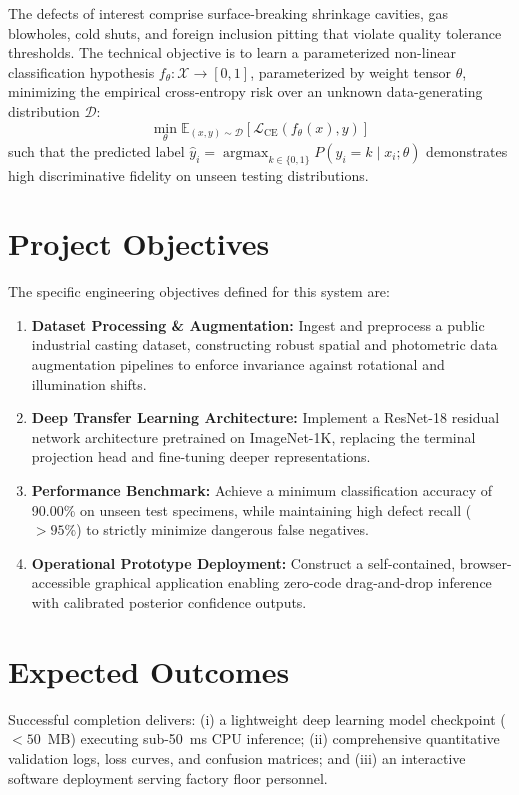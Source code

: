 \documentclass[12pt,a4paper]{report}
\begin{document}
The defects of interest comprise surface-breaking shrinkage cavities, gas blowholes, cold shuts, and foreign inclusion pitting that violate quality tolerance thresholds. The technical objective is to learn a parameterized non-linear classification hypothesis $f_\theta: \mathcal{X} \to [0, 1]$, parameterized by weight tensor $\theta$, minimizing the empirical cross-entropy risk over an unknown data-generating distribution $\mathcal{D}$:
\begin{equation}
    \min_\theta \mathbb{E}_{(x, y) \sim \mathcal{D}} \left[ \mathcal{L}_{\text{CE}}\left(f_\theta(x), y\right) \right]
\end{equation}
such that the predicted label $\hat{y}_i = \operatorname{argmax}_{k \in \{0, 1\}} P(y_i = k \mid x_i; \theta)$ demonstrates high discriminative fidelity on unseen testing distributions.

\section{Project Objectives}
The specific engineering objectives defined for this system are:
\begin{enumerate}
    \item \textbf{Dataset Processing \& Augmentation:} Ingest and preprocess a public industrial casting dataset, constructing robust spatial and photometric data augmentation pipelines to enforce invariance against rotational and illumination shifts.
    \item \textbf{Deep Transfer Learning Architecture:} Implement a ResNet-18 residual network architecture pretrained on ImageNet-1K, replacing the terminal projection head and fine-tuning deeper representations.
    \item \textbf{Performance Benchmark:} Achieve a minimum classification accuracy of 90.00\% on unseen test specimens, while maintaining high defect recall ($>95\%$) to strictly minimize dangerous false negatives.
    \item \textbf{Operational Prototype Deployment:} Construct a self-contained, browser-accessible graphical application enabling zero-code drag-and-drop inference with calibrated posterior confidence outputs.
\end{enumerate}

\section{Expected Outcomes}
Successful completion delivers: (i) a lightweight deep learning model checkpoint ($<50$~MB) executing sub-50~ms CPU inference; (ii) comprehensive quantitative validation logs, loss curves, and confusion matrices; and (iii) an interactive software deployment serving factory floor personnel.
\end{document}
